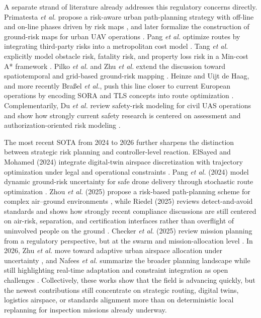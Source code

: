 \documentclass[journal,twoside,web]{ieeecolor}
\begin{document}
 
A separate strand of literature already addresses this regulatory concerns directly. Primatesta \emph{et al.} propose a risk-aware urban path-planning strategy with off-line and on-line phases driven by risk maps \cite{primatesta2019riskaware}, and later formalize the construction of ground-risk maps for urban UAV operations \cite{primatesta2020groundrisk}. Pang \emph{et al.} optimize routes by integrating third-party risks into a metropolitan cost model \cite{pang2022integrated}. Tang \emph{et al.} explicitly model obstacle risk, fatality risk, and property loss risk in a Min-cost A* framework \cite{tang2023thirdparty}. Pilko \emph{et al.} and Zhu \emph{et al.} extend the discussion toward spatiotemporal and grid-based ground-risk mapping \cite{pilko2023spatiotemporal,zhang2023groundrisk}. Heinze and Uijt de Haag, and more recently Bra{\ss}el \emph{et al.}, push this line closer to current European operations by encoding SORA and TLS concepts into route optimization \cite{heinze2023sora,brassel2025riskaware}. Complementarily, Du \emph{et al.} review safety-risk modeling for civil UAS operations and show how strongly current safety research is centered on assessment and authorization-oriented risk modeling \cite{du2024safetyrisk}.


The most recent SOTA from 2024 to 2026 further sharpens the distinction between strategic risk planning and controller-level reaction. ElSayed and Mohamed (2024) integrate digital-twin airspace discretization with trajectory optimization under legal and operational constraints \cite{elsayed2024digitaltwin}. Pang \emph{et al.} (2024) model dynamic ground-risk uncertainty for safe drone delivery through stochastic route optimization \cite{pang2024stochastic}. Zhou \emph{et al.} (2025) propose a risk-based path-planning scheme for complex air--ground environments \cite{zhou2025riskbased}, while Riedel (2025) reviews detect-and-avoid standards and shows how strongly recent compliance discussions are still centered on air-risk, separation, and certification interfaces rather than overflight of uninvolved people on the ground \cite{riedel2025daa}. Checker \emph{et al.} (2025) review mission planning from a regulatory perspective, but at the swarm and mission-allocation level \cite{checker2025regulatory}. In 2026, Zhu \emph{et al.} move toward adaptive urban airspace allocation under uncertainty \cite{zhu2026adaptive}, and Nafees \emph{et al.} summarize the broader planning landscape while still highlighting real-time adaptation and constraint integration as open challenges \cite{nafees2026review}. Collectively, these works show that the field is advancing quickly, but the newest contributions still concentrate on strategic routing, digital twins, logistics airspace, or standards alignment more than on deterministic local replanning for inspection missions already underway.
\end{document}
